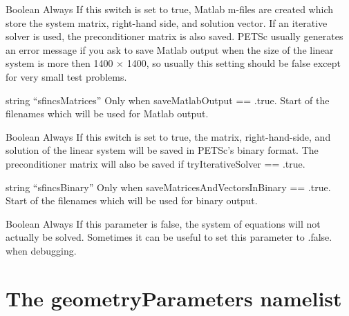 \myhrule

{Boolean}
{\false}
{Always}
{If this switch is set to true, Matlab m-files are created which
 store the system matrix, right-hand side, and solution vector.  If an iterative solver is used,
 the preconditioner matrix is also saved.
 PETSc usually generates an error message if you ask to save Matlab output when
the size of the linear system is more then 1400 $\times$ 1400,
 so usually this setting should be false except for very small test problems.
}

\myhrule

{string}
{``sfincsMatrices''}
{Only when {\ttfamily saveMatlabOutput == .true.}}
{Start of the filenames which will be used for Matlab output.}

\myhrule

{Boolean}
{\false}
{Always}
{If this switch is set to true, the matrix, right-hand-side, and solution of the
linear system will be saved in PETSc's binary format.  The preconditioner matrix will also
be saved if {\ttfamily tryIterativeSolver == .true.}
}

\myhrule

{string}
{``sfincsBinary''}
{Only when {\ttfamily saveMatricesAndVectorsInBinary == .true.}}
{Start of the filenames which will be used for binary output.}

\myhrule

{Boolean}
{\true}
{Always}
{If this parameter is false, the system of equations will not actually be solved.
 Sometimes it can be useful to set this parameter to {\ttfamily .false.} when debugging.
}


\section{The {\ttfamily geometryParameters} namelist}

